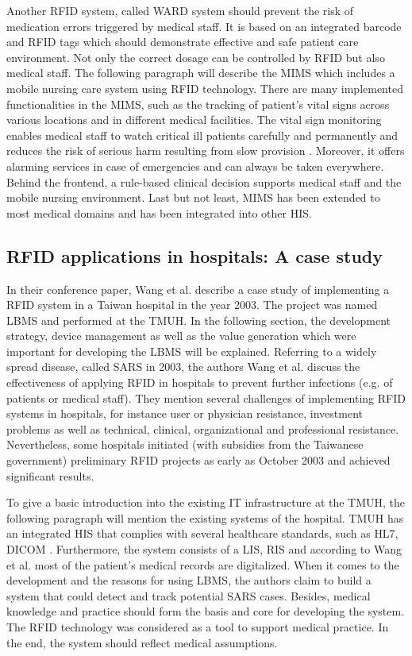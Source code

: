 Another RFID system, called \ac{WARD} system should prevent the risk of medication errors triggered by medical staff. It is based on an integrated barcode and RFID tags which should demonstrate effective and safe patient care environment. 
Not only the correct dosage can be controlled by RFID but also medical staff. The following paragraph will describe the \ac{MIMS} which includes a mobile nursing care system using RFID technology. There are many implemented functionalities in the MIMS, such as the tracking of patient's vital signs across various locations and in different medical facilities. The vital sign monitoring enables medical staff to watch critical ill patients carefully and permanently and reduces the risk of serious harm resulting from slow provision \cite{ncbi}. Moreover, it offers alarming services in case of emergencies and can always be taken everywhere. Behind the frontend, a rule-based clinical decision supports medical staff and the mobile nursing environment. Last but not least, MIMS has been extended to most medical domains and has been integrated into other HIS.

\subsection{RFID applications in hospitals: A case study}

In their conference paper, Wang et al. \cite{casestudy} describe a case study of implementing a RFID system in a Taiwan hospital in the year 2003. The project was named \ac{LBMS} and performed at the \ac{TMUH}. In the following section, the development strategy, device management as well as the value generation which were important for developing the LBMS will be explained. 
Referring to a widely spread disease, called \ac{SARS} in 2003, the authors Wang et al. discuss the effectiveness of applying RFID in hospitals to prevent further infections (e.g. of patients or medical staff). They mention several challenges of implementing RFID systems in hospitals, for instance user or physician resistance, investment problems as well as technical, clinical, organizational and professional resistance. Nevertheless, some hospitals initiated (with subsidies from the Taiwanese government) preliminary RFID projects as early as October 2003 and achieved significant results. 

To give a basic introduction into the existing IT infrastructure at the TMUH, the following paragraph will mention the existing systems of the hospital. TMUH has an integrated HIS that complies with several healthcare standards, such as \ac{HL7}, \ac{DICOM} \cite[p.3 ff.]{casestudy}. Furthermore, the system consists of a LIS, RIS and according to Wang et al. most of the patient's medical records are digitalized. When it comes to the development and the reasons for using LBMS, the authors claim to build a system that could detect and track potential SARS cases. Besides, medical knowledge and practice should form the basis and core for developing the system. The RFID technology was considered as a tool to support medical practice. In the end, the system should reflect medical assumptions. 

